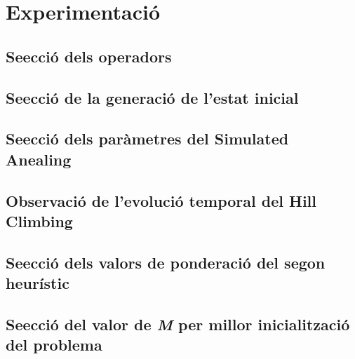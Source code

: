 \section{Experimentació}

\subsection{Se\lgem ecció dels operadors}

\subsection{Se\lgem ecció de la generació de l'estat inicial}

\subsection{Se\lgem ecció dels paràmetres del Simulated Anealing}

\subsection{Observació de l'evolució temporal del Hill Climbing}

\subsection{Se\lgem ecció dels valors de ponderació del segon heurístic}

\subsection{Se\lgem ecció del valor de \emph{M} per millor inicialització del problema}